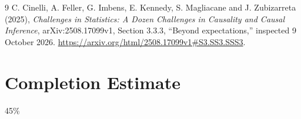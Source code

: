 \documentclass[11pt]{article}
\theoremstyle{remark}
\begin{document}
\begin{thebibliography}{9}
 C. Cinelli, A. Feller, G. Imbens, E. Kennedy, S. Magliacane and J. Zubizarreta (2025), \emph{Challenges in Statistics: A Dozen Challenges in Causality and Causal Inference}, arXiv:2508.17099v1, Section 3.3.3, ``Beyond expectations,'' inspected 9 October 2026. \url{https://arxiv.org/html/2508.17099v1#S3.SS3.SSS3}.
\end{thebibliography}

\section{Completion Estimate}
45\%
\end{document}
